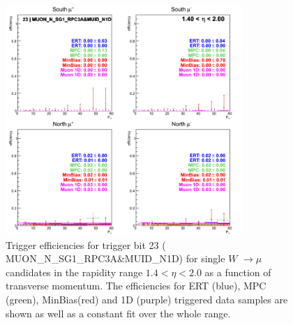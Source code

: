 \begin{figure}[h!]

  \centering

  \includegraphics[width=0.8\textwidth]{./figures/run13_trigeffipt_eta1_trig23_lin.png}
  \caption{\label{fig:run13_trigeffipt_eta1_nper0_trig23_lin} Trigger efficiencies for trigger bit 23 ( MUON\_N\_SG1\_RPC3A\&MUID\_N1D) for single $W$ $\rightarrow \mu$ candidates in the rapidity range $ 1.4 < \eta < 2.0$ as a function of transverse momentum. The efficiencies for ERT (blue), MPC (green), MinBias(red) and 1D (purple) triggered data samples are shown as well as a constant fit over the whole range.}

\end{figure}
\clearpage
